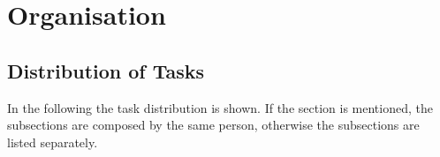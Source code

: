 \documentclass{article}
\begin{document}
%
\pagestyle{headings}  %
%
%

%



 
\newpage
\tableofcontents
\newpage
%

\section{Organisation}

\subsection{Distribution of Tasks}
In the following the task distribution is shown. If the section is mentioned, the subsections are composed by the same person, otherwise the subsections are listed separately.
\end{document}
